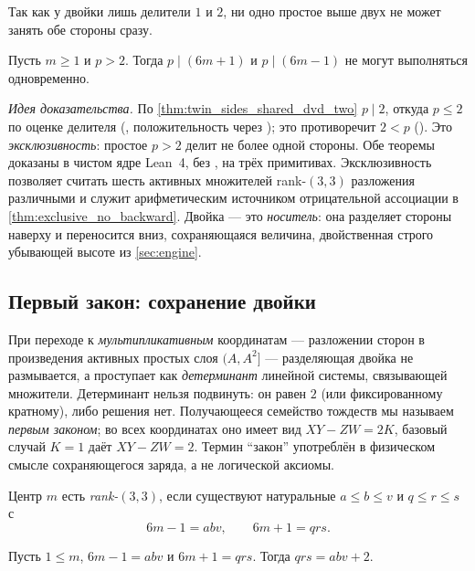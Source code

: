 Так как у двойки лишь делители $1$ и $2$, ни одно простое выше двух не может занять обе стороны
сразу.

\begin{theorem}\label{thm:no_large_shared_divisor}
\green{} Пусть $m\ge 1$ и $p>2$. Тогда $p\mid(6m+1)$ и $p\mid(6m-1)$ не могут выполняться
одновременно.
\end{theorem}

\emph{Идея доказательства.} По \cref{thm:twin_sides_shared_dvd_two} $p\mid 2$, откуда $p\le 2$ по
оценке делителя (, положительность через ); это противоречит
$2<p$ (). Это \emph{эксклюзивность}: простое $p>2$ делит не более одной стороны. Обе
теоремы  доказаны в чистом ядре Lean~4, без , на трёх
примитивах. Эксклюзивность позволяет считать шесть активных множителей rank-$(3,3)$ разложения
различными и служит арифметическим источником отрицательной ассоциации в
\cref{thm:exclusive_no_backward}. Двойка --- это \emph{носитель}: она разделяет стороны наверху и
переносится вниз, сохраняющаяся величина, двойственная строго убывающей высоте из
\cref{sec:engine}.

\subsection{Первый закон: сохранение двойки}

При переходе к \emph{мультипликативным} координатам --- разложении сторон в произведения активных
простых слоя $(A,A^2]$ --- разделяющая двойка не размывается, а проступает как \emph{детерминант}
линейной системы, связывающей множители. Детерминант нельзя подвинуть: он равен $2$ (или
фиксированному кратному), либо решения нет. Получающееся семейство тождеств мы называем
\emph{первым законом}; во всех координатах оно имеет вид $XY-ZW=2K$, базовый случай $K=1$ даёт
$XY-ZW=2$. Термин ``закон'' употреблён в физическом смысле сохраняющегося заряда, а не логической
аксиомы.

\begin{definition}\label{def:rank33}
Центр $m$ есть \emph{rank-$(3,3)$}, если существуют натуральные $a\le b\le v$ и $q\le r\le s$ с
\begin{equation}\label{eq:rank33}
6m-1=abv,\qquad 6m+1=qrs.
\end{equation}
\end{definition}

\begin{theorem}\label{thm:det_law_rank33}
\green{} Пусть $1\le m$, $6m-1=abv$ и $6m+1=qrs$. Тогда $qrs=abv+2$.
\end{theorem}

